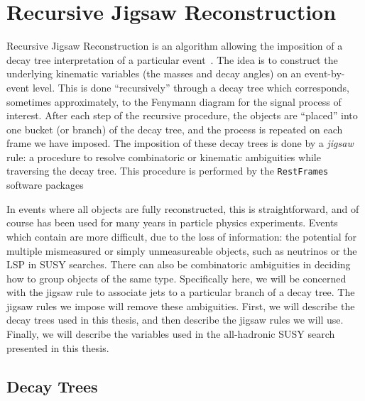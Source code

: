 \section{Recursive Jigsaw Reconstruction}

Recursive Jigsaw Reconstruction is an algorithm allowing the imposition of a decay tree interpretation of a particular event~\cite{Jackson:2016mfb,ATLAS-CONF-2016-078}.
The idea is to construct the underlying kinematic variables (the masses and decay angles) on an event-by-event level.
This is done ``recursively'' through a decay tree which corresponds, sometimes approximately, to the Fenymann diagram for the signal process of interest.
After each step of the recursive procedure, the objects are ``placed'' into one bucket (or branch) of the decay tree, and the process is repeated on each frame we have imposed.
The imposition of these decay trees is done by a \textit{jigsaw} rule: a procedure to resolve combinatoric or kinematic ambiguities while traversing the decay tree.
This procedure is performed by the \texttt{RestFrames} software packages ~\cite{RestFrames}

In events where all objects are fully reconstructed, this is straightforward, and of course has been used for many years in particle physics experiments.
Events which contain \met are more difficult, due to the loss of information: the potential for multiple mismeasured or simply unmeasureable objects, such as neutrinos or the LSP in SUSY searches.
There can also be combinatoric ambiguities in deciding how to group objects of the same type.
Specifically here, we will be concerned with the jigsaw rule to associate jets to a particular branch of a decay tree.
The jigsaw rules we impose will remove these ambiguities.
First, we will describe the decay trees used in this thesis, and then describe the jigsaw rules we will use.
Finally, we will describe the variables used in the all-hadronic SUSY search presented in this thesis.

\subsection{Decay Trees}

